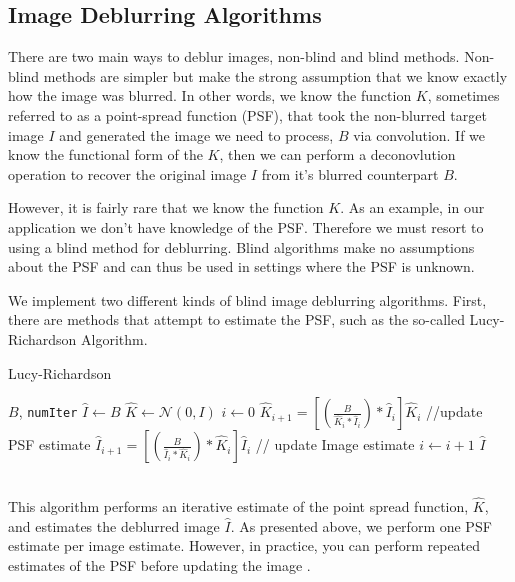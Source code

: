 \documentclass{article}
\begin{document}
\clearpage
\subsection{Image Deblurring Algorithms} \label{section:algo}

There are two main ways to deblur images, non-blind and blind methods. Non-blind methods are simpler but make the strong assumption that we know exactly how the image was blurred. In other words, we know the function $K$, sometimes referred to as a point-spread function (PSF), that took the non-blurred target image $I$ and generated the image we need to process, $B$ via convolution.  If we know the functional form of the $K$, then we can perform a deconovlution operation to recover the original image $I$ from it's blurred counterpart $B$. 

However, it is fairly rare that we know the function $K$. As an example, in our application we don't have knowledge of the PSF. Therefore we must resort to using a blind method for deblurring. Blind algorithms make no assumptions about the PSF and can thus  be used in settings where the PSF is unknown. 

We implement two different kinds of blind image deblurring algorithms. First, there are methods that attempt to estimate the PSF, such as the so-called Lucy-Richardson Algorithm. 
\begin{algorithm}
\caption{Lucy-Richardson}
\begin{algorithmic} 
\REQUIRE $B$, \texttt{numIter}
    \STATE $\hat{I} \leftarrow B$
    \STATE $\hat{K} \leftarrow  \mathcal{N}(0, I)$
    \STATE $i \leftarrow 0$
          \STATE $\hat{K} _{i+1} = \left[ \left(\frac{B}{\hat{K}_i * \hat{I}_i}      \right) * \hat{I}_i \right]\hat{K}_i $ //update PSF estimate 
           \STATE $\hat{I} _{i+1} = \left[ \left(\frac{B}{\hat{I}_i * \hat{K}_i}      \right) * \hat{K}_i \right]\hat{I}_i $ //  update Image estimate
        \STATE $i \leftarrow i + 1$
    \ENDWHILE
    \RETURN $\hat{I}$
\end{algorithmic}
\end{algorithm}\\
This algorithm performs an iterative estimate of the point spread function, $\hat{K}$, and estimates the deblurred image $\hat{I}$. As presented above, we perform one PSF estimate per image estimate. However, in practice, you can perform repeated estimates of the PSF before updating the image \cite{LRalgo}.
\end{document}
